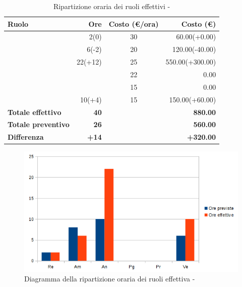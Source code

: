 \documentclass[12pt,a4paper]{article}
\begin{document}
\begin{table}[H]
	\begin{center}
		\begin{tabular}{l r c r}
			\toprule
			\textbf{Ruolo}	& \textbf{Ore} & \textbf{Costo (\euro/ora)}	& \textbf{Costo (\euro)} \\ \midrule
			\midrule
            \RE{} & 2(0) & 30 & 60.00(+0.00) \\ \midrule
            \AM{} & 6(-2) & 20 & 120.00(-40.00) \\ \midrule
            \AN{} & 22(+12) & 25 & 550.00(+300.00) \\ \midrule
			\PG{} & & 22 & 0.00 \\ \midrule
			\PR{} & & 15 & 0.00 \\ \midrule
            \VR{} & 10(+4) & 15 & 150.00(+60.00) \\ \midrule
            \textbf{Totale effettivo} & \textbf{40} &  & \textbf{880.00} \\ \midrule
			\textbf{Totale preventivo} & \textbf{26} &  & \textbf{560.00} \\ \midrule
			\textbf{Differenza} & \textbf{+14} &  & \textbf{+320.00} \\ \midrule
			\bottomrule
		\end{tabular}
		\caption{Ripartizione oraria dei ruoli effettivi - \FAD{}}
	\end{center}
\end{table}

\begin{center}
	\begin{figure}[H]
		\centering
		\includegraphics[width=\textwidth]{../img/diagrammaBarreAnalisiDiDettaglioConsuntivo.png}
		\caption{Diagramma della ripartizione oraria dei ruoli effettiva - \FAD{}}
	\end{figure}
\end{center}
\end{document}

